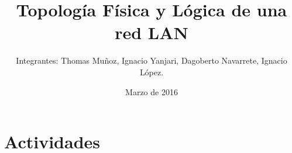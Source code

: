 \documentclass{udpreport}
\title{Topología Física y Lógica de una red LAN}
\author{Integrantes: Thomas Muñoz, Ignacio Yanjari, Dagoberto Navarrete, Ignacio López.}
\date{Marzo de 2016}
\begin{document}
\maketitle
\tableofcontents
\chapter{Actividades}
\end{document}
